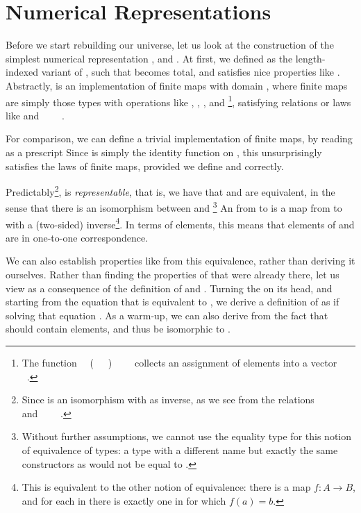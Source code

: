 \section{Numerical Representations}\label{sec:desc-numrep}
Before we start rebuilding our universe, let us look at the construction of the simplest numerical representation \bN{},  and . At first, we defined  as the length-indexed variant of , such that  becomes total, and satisfies nice properties like . Abstractly,  is an implementation of finite maps with domain , where finite maps are simply those types with operations like , , , and \footnote{The function \ \AV{:}\ (\ \ \ )\ \ \ \  collects an assignment of elements  into a vector \ .}, satisfying relations or laws like  and \ \ \ \ . 

For comparison, we can define a trivial implementation of finite maps, by reading  as a prescript
Since  is simply the identity function on , this unsurprisingly satisfies the laws of finite maps, provided we define  and  correctly.

Predictably\footnote{Since  is an isomorphism with  as inverse, as we see from the relations \ \ \ \  and  \ \ \ \ .},  is \emph{representable}, that is, we have that  and  are equivalent, in the sense that there is an isomorphism between  and \footnote{Without further assumptions, we cannot use the equality type  for this notion of equivalence of types: a type with a different name but exactly the same constructors as  would not be equal to .}
An  from  to  is a map from  to  with a (two-sided) inverse\footnote{This is equivalent to the other notion of equivalence: there is a map $f : A \to B$, and for each  in  there is exactly one  in  for which $f(a) = b$.}. In terms of elements, this means that elements of  and  are in one-to-one correspondence.

We can also establish properties like  from this equivalence, rather than deriving it ourselves. Rather than finding the properties of  that were already there, let us view  as a consequence of the definition of \bN{} and . Turning the  on its head, and starting from the equation that  is equivalent to , we derive a definition of  as if solving that equation \cite{calcdata}. As a warm-up, we can also derive  from the fact that \  should contain  elements, and thus be isomorphic to .

